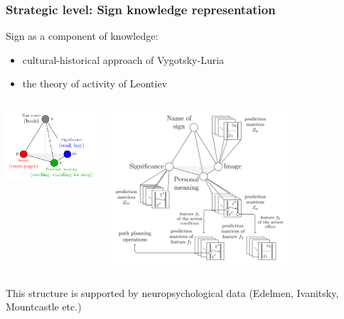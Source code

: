 \documentclass[default]{beamer}
\begin{document}
	\begin{frame}
		\frametitle{Strategic level: Sign knowledge representation}
		\small
		Sign as a component of knowledge:
		\begin{itemize}
			\item cultural-historical approach of Vygotsky-Luria
			\item the theory of activity of Leontiev
		\end{itemize}
		
		\begin{columns}
			\begin{column}{0.4\textwidth}
				\centering
				\includegraphics[width=\textwidth]{signs/sign_colored_rita.pdf}
			\end{column}
			\begin{column}{0.6\textwidth}
				\centering
				\includegraphics[width=0.7\textwidth]{signs/sign_kr.png}
			\end{column}
		\end{columns}
		
		This structure is supported by neuropsychological data (Edelmen, Ivanitsky, Mountcastle etc.)
		\nocite{*}
		\printbibliography[keyword={nerosign}, resetnumbers=true]
		
	\end{frame}
\end{document}
